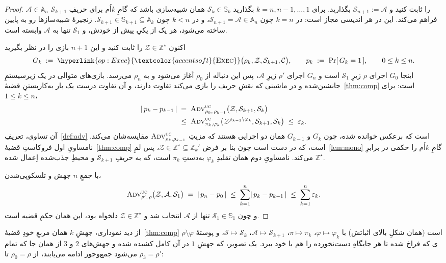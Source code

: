 \documentclass[10pt,oneside,openany]{book}
\newcommand{\Corr}{\mathcal{C}}
\newcommand{\Zenv}{\mathcal{Z}}
\newcommand{\Adv}{\mathcal{A}}
\newcommand{\Sim}{\mathcal{S}}
\newcommand{\advtg}{\op{Adv}}
\newcommand{\Aset}{\mathbb{A}}
\newcommand{\SimSet}{\mathbb{S}}
\newcommand{\ZenvSet}{\mathbb{Z}}
\newcommand{\op}[1]{\textnormal{\textsc{#1}}}
\newcommand{\opl}[1]{\hyperlink{op:#1}{\textcolor{accentsoft}{\op{#1}}}}
\theoremstyle{accentdef}
\theoremstyle{accentplain}
\begin{document}
\begin{proof}
$\Adv \in \Aset_n$ را ثابت کنید و $\Sim_{n+1} := \Adv$ بگذارید. برای $k =
n, n-1, \dots, 1$ بگذارید $\Sim_k \in \SimSet_k$ همان شبیه‌سازی باشد که
گامِ $k$اُم برای حریفِ $\Sim_{k+1}$ فراهم می‌کند. این در هر اندیسی مجاز
است: در $k = n$ چون $\Sim_{n+1} = \Adv \in \Aset_n$، و در $k < n$ چون
$\Sim_{k+1} \in \SimSet_{k+1} \subseteq \Aset_k$. زنجیرهٔ شبیه‌سازها رو به
پایین ساخته می‌شود، هر یک از یکیِ پیش از خودش، و $\Sim_1$ تنها به $\Adv$
وابسته است.

اکنون $\Zenv \in \ZenvSet^{\star}$ را ثابت کنید و این $n+1$ بازی را در
نظر بگیرید
\[
  G_k \;:=\; \opl{Exec}\bigl(\rho_k,\Zenv,\Sim_{k+1},\Corr\bigr), \qquad p_k \;:=\; \Pr[\,G_k = 1\,], \qquad 0 \leq k \leq n .
\]
اینجا $G_0$ اجرای $\rho$ زیرِ $\Sim_1$ است و $G_n$ اجرای $\rho'$ زیرِ
$\Adv$، پس این دنباله از $\rho_0$ آغاز می‌شود و به $\rho_n$ می‌رسد.
بازی‌های متوالی در یک زیرسیستمِ جانشین‌شده و در ماشینی که نقشِ حریف را
بازی می‌کند تفاوت دارند، و آن تفاوت درست یک بار به‌کاربستنِ
قضیهٔ~\ref{thm:comp} است: برای $1 \leq k \leq n$،
\[
  \begin{aligned}
  \lvert\,p_k - p_{k-1}\,\rvert
  \;&=\;
  \advtg^{\op{uc}}_{\rho_k,\,\rho_{k-1}}\bigl(\Zenv,\Sim_{k+1},\Sim_k\bigr) \\
  \;&\leq\;
  \advtg^{\op{uc}}_{\pi_k,\varphi_k}\bigl(\Zenv^{\rho_{k-1} \setminus \varphi_k},\Sim_{k+1},\Sim_k\bigr)
  \;\leq\;
  \varepsilon_k .
  \end{aligned}
\]
آن تساوی، تعریفِ~\ref{def:adv} است که برعکس خوانده شده، چون $G_k$ و
$G_{k-1}$ همان دو اجرایی هستند که مزیتِ
$\advtg^{\op{uc}}_{\rho_k,\rho_{k-1}}$ مقایسه‌شان می‌کند. نامساویِ اول
فروکاستِ قضیهٔ~\ref{thm:comp} است، که در دست است چون بنا بر فرض $\Zenv \in
\ZenvSet^{\star} \subseteq \ZenvSet_k'$، پس لمِ~\ref{lem:mono} گامِ
$k$اُم را حکمی در برابرِ $\ZenvSet^{\star}$ می‌کند. نامساویِ دوم همان
تقلیدِ $\varphi_k$ به‌دستِ $\pi_k$ است، که به حریفِ $\Sim_{k+1}$ و محیطِ
جذب‌شده اِعمال شده.

با جمعِ $n$ جهش و تلسکوپی‌شدن،
\[
  \advtg^{\op{uc}}_{\rho',\,\rho}\bigl(\Zenv,\Adv,\Sim_1\bigr)
  \;=\; \lvert\,p_n - p_0\,\rvert
  \;\leq\; \sum_{k=1}^{n} \lvert\,p_k - p_{k-1}\,\rvert
  \;\leq\; \sum_{k=1}^{n} \varepsilon_k .
\]
و چون $\Sim_1 \in \SimSet_1$ تنها از $\Adv$ انتخاب شد و $\Zenv \in
\ZenvSet^{\star}$ دلخواه بود، این همان حکمِ قضیه است.
\end{proof}

از دید نموداری، جهشِ $k$ همان مربعِ خودِ قضیهٔ~\ref{thm:comp} است (همان
شکلِ بالای اثباتش) با $\varphi \mapsto \varphi_k$، $\pi \mapsto \pi_k$،
$\Adv \mapsto \Sim_{k+1}$، $\Sim \mapsto \Sim_k$، و پوستهٔ $\rho \setminus
\varphi$ی که فراخ شده تا هر جایگاهِ دست‌نخورده را هم با خود ببرد. یک
تصویر، که جهشِ $1$ در آن کامل کشیده شده و جهش‌های $2$ و $3$ از همان جا که
تمام می‌شود جمع‌وجور ادامه می‌یابند، از $\rho_0 = \rho$ تا $\rho_3 =
\rho'$:
\end{document}

